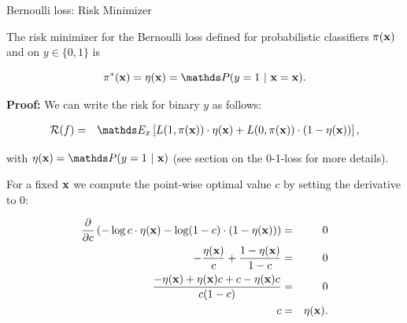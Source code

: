 \documentclass[11pt,compress,t,notes=noshow, xcolor=table]{beamer}
\begin{document}
\begin{vbframe}{Bernoulli loss: Risk Minimizer}

The risk minimizer for the Bernoulli loss defined for probabilistic classifiers $\pi(\mathbf{x})$ and on $y \in \{0, 1\}$ is

$$
  \pixbayes = \eta(\xv) = \P(y = 1 ~|~ \xv = \xv). 
$$

\vspace*{0.2cm}

\begin{footnotesize}
\textbf{Proof:} We can write the risk for binary $y$ as follows: 





\vspace*{-0.3cm}

\begin{eqnarray*}
  \riskf &=& \E_x \left[L(1, \pix) \cdot \eta(\xv) + L(0, \pix) \cdot (1 - \eta(\xv)) \right],
\end{eqnarray*}

with $\eta(\xv) = \P(y = 1 ~|~ \xv)$ (see section on the 0-1-loss for more details). 

For a fixed $\mathbf{x}$ we compute the point-wise optimal value $c$ by setting the derivative to $0$: 

\vspace*{-0.3cm}

\begin{eqnarray*}
  \frac{\partial }{\partial c} \left(- \log c  \cdot \eta(\mathbf{x})- \log (1 - c) \cdot (1 - \eta(\mathbf{x}))\right) &=& 0 \\
  - \frac{\eta(\mathbf{x})}{c} + \frac{1 - \eta(\mathbf{x})}{1 - c} &=& 0 \\
  \frac{- \eta(\mathbf{x}) + \eta(\mathbf{x}) c + c - \eta(\mathbf{x}) c}{c (1 - c)} &=& 0 \\
  c &=& \eta(\mathbf{x}). 
\end{eqnarray*}


\end{footnotesize}
\end{vbframe}
\end{document}
